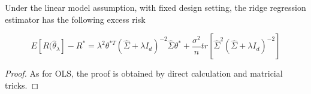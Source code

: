 \documentclass[
10pt, %
a4paper, %
oneside, %
headinclude,footinclude, %
BCOR5mm, %
]{scrartcl}
\begin{document}
\begin{proposition}
    
    Under the linear model assumption, with fixed design setting, the ridge regression estimator has the following excess risk

    \begin{equation}
	E[ R( \hat{\theta}_{\lambda}]-R^* = \lambda^2\theta^{*T} ( \hat{\Sigma}+\lambda I_d)^{-2} \hat{\Sigma} \theta^*+ \frac{\sigma^2}{n} tr[ \hat{\Sigma}^2( \hat{\Sigma}+\lambda I_d)^{-2} ]
    \end{equation}
\end{proposition}

\begin{proof}
As for OLS, the proof is obtained by direct calculation and matricial tricks.
\end{proof}
\end{document}
